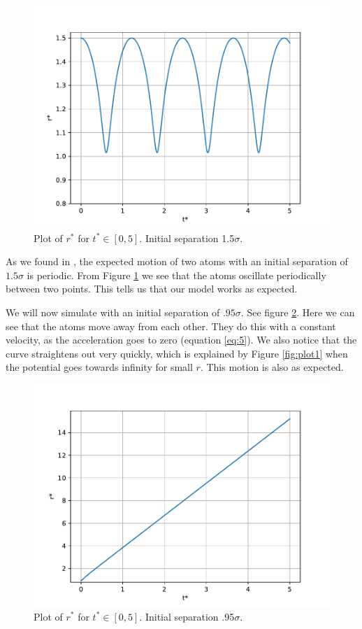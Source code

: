 \documentclass[a4paper,10pt,english]{article}
\begin{document}
\begin{figure}[h!] 
    \centering 
    \includegraphics[scale=.65]{../figures/2_b_ii.pdf} 
    \caption{Plot of $r^*$ for $t^*\in[0, 5]$. Initial separation 1.5$\sigma$.}
    \label{fig:plot2}
\end{figure}

As we found in \textit{}, the expected motion of two atoms with an initial separation of $1.5\sigma$ is periodic. From Figure \ref{fig:plot2} we see that the atoms oscillate periodically between two points. This tells us that our model works as expected.

We will now simulate with an initial separation of $.95\sigma$. See figure \ref{fig:plot3}. Here we can see that the atoms move away from each other. They do this with a constant velocity, as the acceleration goes to zero (equation \ref{eq:5}). We also notice that the curve straightens out very quickly, which is explained by Figure \ref{fig:plot1} when the potential goes towards infinity for small $r$. This motion is also as expected. 

\begin{figure}[h!]
    \centering 
    \includegraphics[scale=.65]{../figures/2_b_iv.pdf} 
    \caption{Plot of $r^*$ for $t^*\in[0, 5]$. Initial separation .95$\sigma$.}
    \label{fig:plot3}
\end{figure}
\end{document}

